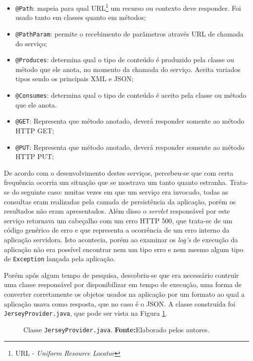 	\begin{itemize}
	  \item \texttt{@Path}: mapeia para qual URL\footnote{URL - \textit{Uniform
	  Resource Locator}} um recurso ou contexto deve responder. Foi usado tanto em
	  classes quanto em métodos;
	  \item \texttt{@PathParam}: permite o recebimento de parâmetros através URL de
	  chamada do serviço;
	  \item \texttt{@Produces}: determina qual o tipo de conteúdo é produzido pela
	  classe ou método que ele anota, no momento da chamada do serviço. Aceita
	  variados tipos sendo os principais XML e JSON;
	  \item \texttt{@Consumes}: determina qual o tipo de conteúdo é aceito pela
	  classe ou método que ele anota. 
	  \item \texttt{@GET}: Representa que método anotado, deverá responder somente
	  ao método HTTP GET;
	  \item \texttt{@PUT}: Representa que método anotado, deverá responder somente
	  ao método HTTP PUT;
	\end{itemize}
	
	\par De acordo com o desenvolvimento destes serviços, percebeu-se que com certa
frequência ocorria um situação que se mostrava um tanto quanto estranha.
Trata-se do seguinte caso: muitas vezes em que um serviço era invocado, todas
as consultas eram realizadas pela camada de persistência da aplicação, porém os
resultados não eram apresentados. Além disso o \textit{servlet} responsável por
este serviço retornava um cabeçalho com um erro HTTP {500}, que trata-se de um
código genérico de erro e que representa a ocorrência de um erro interno da
aplicação servidora. Isto acontecia, porém ao examinar os \textit{log's} de
execução da aplicação não era possível  encontrar nem um tipo erro e nem mesmo
algum tipo de \texttt{Exception} lançada pela aplicação.
	
	\par Porém após algum tempo de pesquisa, descobriu-se que era necessário
contruir uma classe responsável por disponibilizar em tempo de execução, uma
forma de converter corretamente os objetos  usados na aplicação por um formato
ao qual a aplicação usava como resposta, que no caso é o JSON. A classe
construída foi \texttt{JerseyProvider.java}, que pode ser vista na Figura
\ref{fig:desws27_1}.

	\begin{figure}[h!]
		
		\caption[Classe JerseyProvider.java]{Classe \texttt{JerseyProvider.java}.
		\textbf{Fonte:}Elaborado pelos autores.}
		\label{fig:desws27_1}
	\end{figure}
	
